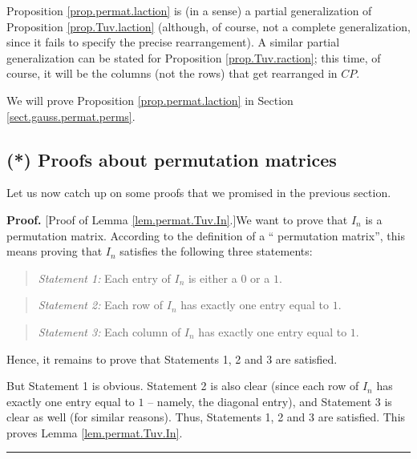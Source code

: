 \documentclass[numbers=enddot,12pt,final,onecolumn,notitlepage]{scrartcl}%
\theoremstyle{definition}
\newenvironment{statement}{\begin{quote}}{\end{quote}}
\newenvironment{proof}[1][Proof]{\noindent\textbf{#1.} }{\ \rule{0.5em}{0.5em}}
\begin{document}
Proposition \ref{prop.permat.laction} is (in a sense) a partial generalization
of Proposition \ref{prop.Tuv.laction} (although, of course, not a complete
generalization, since it fails to specify the precise rearrangement). A
similar partial generalization can be stated for Proposition
\ref{prop.Tuv.raction}; this time, of course, it will be the columns (not the
rows) that get rearranged in $CP$.

We will prove Proposition \ref{prop.permat.laction} in Section
\ref{sect.gauss.permat.perms}.

\subsection{\label{sect.gauss.permat.proofs}(*) Proofs about permutation
matrices}

Let us now catch up on some proofs that we promised in the previous section.

\begin{proof}
[Proof of Lemma \ref{lem.permat.Tuv.In}.]We want to prove that $I_{n}$ is a
permutation matrix. According to the definition of a \textquotedblleft
permutation matrix\textquotedblright, this means proving that $I_{n}$
satisfies the following three statements:

\begin{statement}
\textit{Statement 1:} Each entry of $I_{n}$ is either a $0$ or a $1$.
\end{statement}

\begin{statement}
\textit{Statement 2:} Each row of $I_{n}$ has exactly one entry equal to $1$.
\end{statement}

\begin{statement}
\textit{Statement 3:} Each column of $I_{n}$ has exactly one entry equal to
$1$.
\end{statement}

Hence, it remains to prove that Statements 1, 2 and 3 are satisfied.

But Statement 1 is obvious. Statement 2 is also clear (since each row of
$I_{n}$ has exactly one entry equal to $1$ -- namely, the diagonal entry), and
Statement 3 is clear as well (for similar reasons). Thus, Statements 1, 2 and
3 are satisfied. This proves Lemma \ref{lem.permat.Tuv.In}.
\end{proof}
\end{document}
